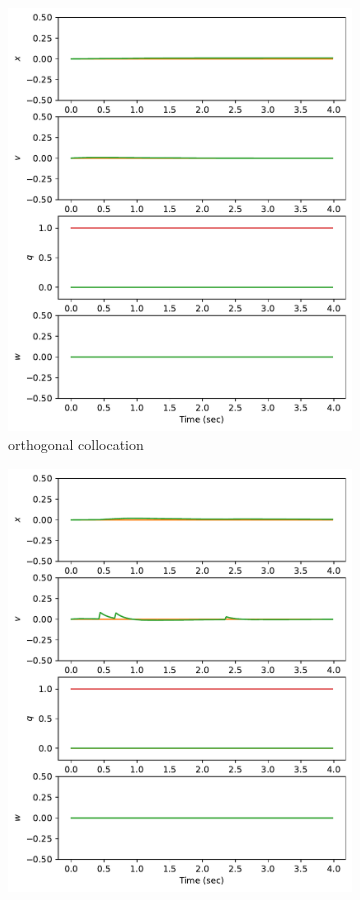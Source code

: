 \documentclass[]{article}
\begin{document}
\begin{figure}[H]
\begin{subfigure}[b]{0.3\textwidth}
 		\includegraphics[width=\textwidth]{figures/statehover1.pdf}
 		\caption{orthogonal collocation}
 	\end{subfigure}%
 	\begin{subfigure}[b]{0.3\textwidth}
 		\centering
 		\includegraphics[width=\textwidth]{figures/statehover2.pdf}

\end{subfigure}
\end{figure}
\end{document}
